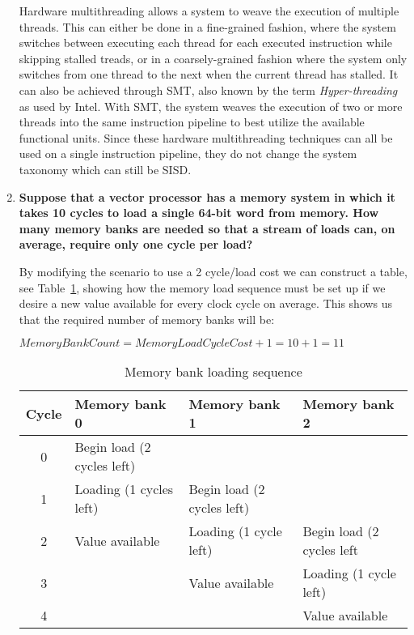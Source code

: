 \begin{enumerate}
Hardware multithreading allows a system to weave the execution of multiple threads. This can either be done in a fine-grained fashion, where the system switches between executing each thread for each executed instruction while skipping stalled treads, or in a coarsely-grained fashion where the system only switches from one thread to the next when the current thread has stalled. It can also be achieved through \ac{SMT}, also known by the term \textit{Hyper-threading} as used by Intel. With \ac{SMT}, the system weaves the execution of two or more threads into the same instruction pipeline to best utilize the available functional units. Since these hardware multithreading techniques can all be used on a single instruction pipeline, they do not change the system taxonomy which can still be \ac{SISD}.

\item \textbf{Suppose that a vector processor has a memory system in which it takes 10 cycles to load a single 64-bit word from memory. How many memory banks are needed so that a stream of loads can, on average, require only one cycle per load?}

By modifying the scenario to use a 2 cycle/load cost we can construct a table, see Table~\ref{table:memory_bank_loading}, showing how the memory load sequence must be set up if we desire a new value available for every clock cycle on average. This shows us that the required number of memory banks will be:

\begin{math}
\mathit{MemoryBankCount} = \mathit{MemoryLoadCycleCost} + 1 = 10 + 1 = 11
\end{math}

\begin{center}
\begin{table}
\begin{tabular}{clll}
\hline
Cycle & Memory bank 0               & Memory bank 1              & Memory bank 2\\
\hline
0     & Begin load (2 cycles left)  &                            & \\
1     & Loading (1 cycles left)     & Begin load (2 cycles left) & \\
2     & Value available             & Loading (1 cycle left)     & Begin load (2 cycles left \\
3     &                             & Value available            & Loading (1 cycle left) \\
4     &                             &                            & Value available\\
\hline
\end{tabular}
\caption{Memory bank loading sequence}
\label{table:memory_bank_loading}
\end{table}
\end{center}

\end{enumerate}



